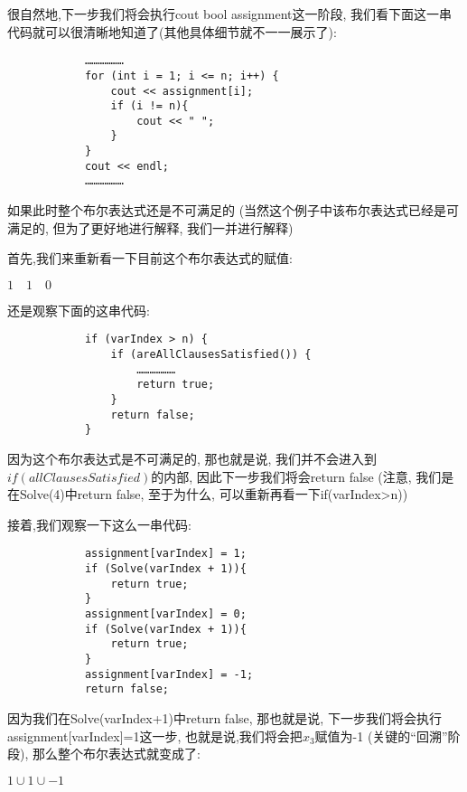         很自然地,下一步我们将会执行cout bool assignment这一阶段,
        我们看下面这一串代码就可以很清晰地知道了(其他具体细节就不一一展示了):
        \begin{lstlisting}
            ………………
            for (int i = 1; i <= n; i++) {
                cout << assignment[i];
                if (i != n){
                    cout << " ";
                } 
            }
            cout << endl;
            ………………
        \end{lstlisting}
        \par
        如果此时整个布尔表达式还是不可满足的
        (当然这个例子中该布尔表达式已经是可满足的,
        但为了更好地进行解释,
        我们一并进行解释)
        \par

        首先,我们来重新看一下目前这个布尔表达式的赋值:
        \begin{center}
            $1\quad 1 \quad 0$
        \end{center}
        \par
        还是观察下面的这串代码:
        \begin{lstlisting}
            if (varIndex > n) {
                if (areAllClausesSatisfied()) {
                    ………………
                    return true;
                }
                return false;
            }
        \end{lstlisting}
        \par
        因为这个布尔表达式是不可满足的,
        那也就是说,
        我们并不会进入到$if(allClausesSatisfied)$的内部,
        因此下一步我们将会return false
        (注意,
        我们是在Solve(4)中return false,
        至于为什么,
        可以重新再看一下if(varIndex>n))

        \par

        接着,我们观察一下这么一串代码:

        \begin{lstlisting}
            assignment[varIndex] = 1;
            if (Solve(varIndex + 1)){
                return true;
            }
            assignment[varIndex] = 0;
            if (Solve(varIndex + 1)){
                return true;
            } 
            assignment[varIndex] = -1;
            return false;
        \end{lstlisting}
        \par
        因为我们在Solve(varIndex+1)中return false,
        那也就是说,
        下一步我们将会执行assignment[varIndex]=1这一步,
        也就是说,我们将会把$x_{3}$赋值为-1
        (关键的``回溯''阶段),
        那么整个布尔表达式就变成了:
        \begin{center}
            $1 \cup  1 \cup -1$
        \end{center}
        
